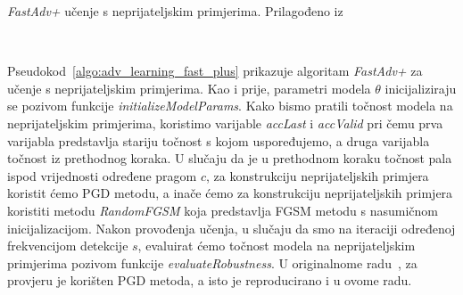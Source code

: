 \documentclass[times, utf8, zavrsni, numeric]{fer}
\begin{document}
\begin{algorithm}[t]
    \caption{\textit{FastAdv+} učenje s neprijateljskim primjerima. Prilagođeno iz~\cite{li2020towards}}
    \label{algo:adv_learning_fast_plus}
    \begin{algorithmic}
        \\\hrulefill
                \ELSE 
                \ENDIF
                \ENDIF 
            \ENDFOR
        \ENDFOR
    \end{algorithmic}
\end{algorithm}

Pseudokod~\ref{algo:adv_learning_fast_plus} prikazuje algoritam \textit{FastAdv+} za učenje s neprijateljskim primjerima.
Kao i prije, parametri modela $\theta$ inicijaliziraju se pozivom funkcije \textit{initializeModelParams}.
Kako bismo pratili točnost modela na neprijateljskim primjerima, koristimo varijable \textit{accLast} i \textit{accValid} 
pri čemu prva varijabla predstavlja stariju točnost s kojom uspoređujemo, a druga varijabla točnost iz prethodnog koraka.
U slučaju da je u prethodnom koraku točnost pala ispod vrijednosti određene pragom $c$, za konstrukciju neprijateljskih primjera koristit ćemo PGD metodu,
a inače ćemo za konstrukciju neprijateljskih primjera koristiti metodu \textit{RandomFGSM} koja predstavlja FGSM metodu s nasumičnom inicijalizacijom.
Nakon provođenja učenja, u slučaju da smo na iteraciji određenoj frekvencijom detekcije $s$, evaluirat ćemo točnost modela na neprijateljskim primjerima pozivom funkcije \textit{evaluateRobustness}.
U originalnome radu~\cite{li2020towards}, za provjeru je korišten PGD metoda, a isto je reproducirano i u ovome radu. 
\end{document}
